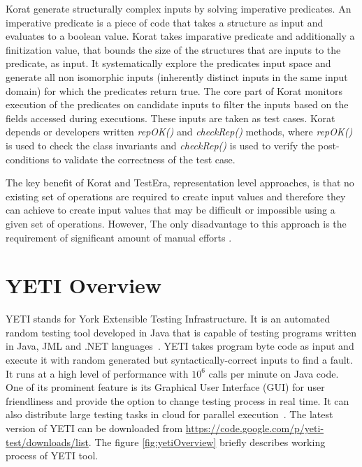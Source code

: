 Korat generate structurally complex inputs by solving imperative predicates. An imperative predicate is a piece of code that takes a structure as input and evaluates to a boolean value. Korat takes imparative predicate and additionally a finitization value, that bounds the size of the structures that are inputs to the predicate, as input. It systematically explore the predicates input space and generate all non isomorphic inputs (inherently distinct inputs in the same input domain) for which the predicates return true. The core part of Korat monitors execution of the predicates on candidate inputs to filter the inputs based on the fields accessed during executions. These inputs are taken as test cases. Korat depends or developers written {\it repOK()} and {\it checkRep()} methods, where {\it repOK()} is used to check the class invariants and {\it checkRep()} is used to verify the post-conditions to validate the correctness of the test case. 

The key benefit of Korat and TestEra, representation level approaches, is that no existing set of operations are required to create input values and therefore they can achieve to create input values that may be difficult or impossible using a given set of operations. However, The only disadvantage to this approach is the requirement of significant amount of manual efforts \cite{pacheco2009directed}.    


\newpage

\section{YETI Overview}
YETI stands for York Extensible Testing Infrastructure. It is an automated random testing tool developed in Java that is capable of testing programs written in Java, JML and .NET languages~\cite{Oriol2010c}. YETI takes program byte code as input and execute it with random generated but syntactically-correct inputs to find a fault. It runs at a high level of performance with $10^6$ calls per minute on Java code. One of its prominent feature is its Graphical User Interface (GUI) for user friendliness and provide the option to change testing process in real time. It can also distribute large testing tasks in cloud for parallel execution~\cite{Oriol2010}. The latest version of YETI can be downloaded from \url{https://code.google.com/p/yeti-test/downloads/list}. The figure \ref{fig:yetiOverview} briefly describes working process of YETI tool. 

